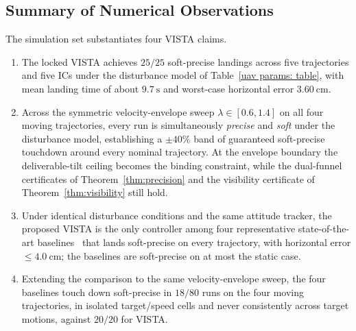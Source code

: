 \documentclass{IEEEtaes}
\theoremstyle{definition}
\theoremstyle{remark}
\begin{document}
\subsection{Summary of Numerical Observations}
\label{summary: subsec}
The simulation set substantiates four VISTA claims.
\begin{enumerate}
    \item The locked VISTA achieves $25/25$ soft-precise landings across five trajectories and five ICs under the disturbance model of Table~\ref{uav params: table}, with mean landing time of about $9.7~\text{s}$ and worst-case horizontal error $3.60~\text{cm}$.
    \item Across the symmetric velocity-envelope sweep $\lambda\in[0.6,1.4]$ on all four moving trajectories, every run is simultaneously \emph{precise} and \emph{soft} under the disturbance model, establishing a $\pm 40\%$ band of guaranteed soft-precise touchdown around every nominal trajectory. At the envelope boundary the deliverable-tilt ceiling becomes the binding constraint, while the dual-funnel certificates of Theorem~\ref{thm:precision} and the visibility certificate of Theorem~\ref{thm:visibility} still hold.
    \item Under identical disturbance conditions and the same attitude tracker, the proposed VISTA is the only controller among four representative state-of-the-art baselines~\cite{lin2022,zhang2026,lin2023,cho2022} that lands soft-precise on every trajectory, with horizontal error $\le 4.0~\text{cm}$; the baselines are soft-precise on at most the static case.
    \item Extending the comparison to the same velocity-envelope sweep, the four baselines touch down soft-precise in $18/80$ runs on the four moving trajectories, in isolated target/speed cells and never consistently across target motions, against $20/20$ for VISTA.
\end{enumerate}




\end{document}

